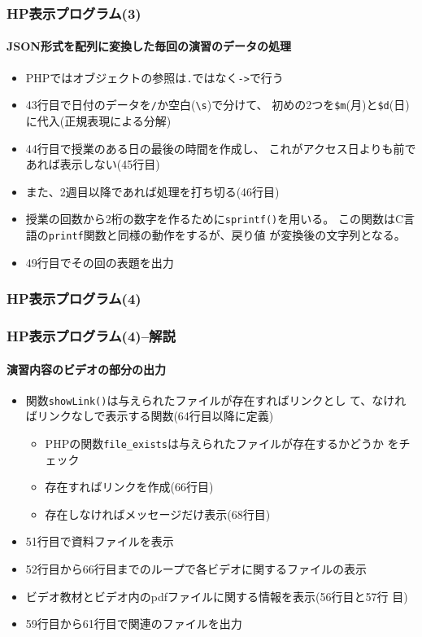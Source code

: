 \begin{frame}[containsverbatim]
 \frametitle{HP表示プログラム(3)}
 \framesubtitle{JSON形式を配列に変換した毎回の演習のデータの処理}
 \scriptsize
  \begin{itemize}
  \item PHPではオブジェクトの参照は\texttt{.}ではなく\Verb+->+で行う
  \item 43行目で日付のデータを\texttt{/}か空白(\Verb+\s+)で分けて、
        初めの2つを\Verb+$m+(月)と\Verb+$d+(日)に代入(正規表現による分解)
  \item 44行目で授業のある日の最後の時間を作成し、
        これがアクセス日よりも前であれば表示しない(45行目)
  \item また、2週目以降であれば処理を打ち切る(46行目)
  \item 授業の回数から2桁の数字を作るために\texttt{sprintf()}を用いる。
        この関数はC言語の\texttt{printf}関数と同様の動作をするが、戻り値
        が変換後の文字列となる。
  \item 49行目でその回の表題を出力
 \end{itemize}
\end{frame}
\begin{frame}[containsverbatim]
 \frametitle{HP表示プログラム(4)}
\end{frame}
\begin{frame}[containsverbatim]
 \frametitle{HP表示プログラム(4)--解説}
\framesubtitle{演習内容のビデオの部分の出力}
\begin{itemize}
 \item 関数\texttt{showLink()}は与えられたファイルが存在すればリンクとし
       て、なければリンクなしで表示する関数(64行目以降に定義)
 \begin{itemize}
 \item PHPの関数\Verb+file_exists+は与えられたファイルが存在するかどうか
       をチェック
 \item 存在すればリンクを作成(66行目)
 \item 存在しなければメッセージだけ表示(68行目)
\end{itemize}
\item 51行目で資料ファイルを表示
 \item 52行目から66行目までのループで各ビデオに関するファイルの表示
 \item ビデオ教材とビデオ内のpdfファイルに関する情報を表示(56行目と57行
       目)
 \item 59行目から61行目で関連のファイルを出力
\end{itemize}
\end{frame}
